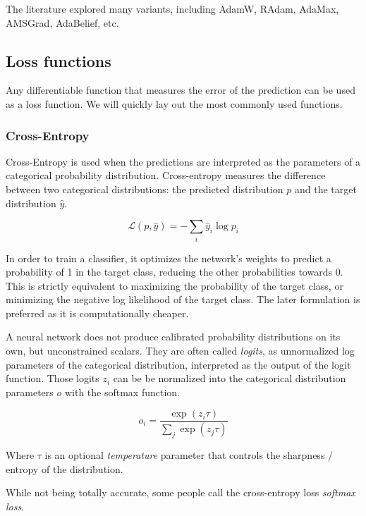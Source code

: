 The literature explored many variants, including AdamW, RAdam, AdaMax, AMSGrad, AdaBelief, etc.

\subsection{Loss functions}

Any differentiable function that measures the error of the prediction can be used as a loss function. We will quickly lay out the most commonly used functions. 

\subsubsection{Cross-Entropy}

Cross-Entropy is used when the predictions are interpreted as the parameters of a categorical probability distribution. Cross-entropy measures the difference between two categorical distributions: the predicted distribution $p$ and the target distribution $\hat{y}$.

\begin{equation}
    \mathcal{L}(p, \hat{y}) = - \sum_i \hat{y}_i \log p_i
\end{equation}

In order to train a classifier, it optimizes the network's weights to predict a probability of 1 in the target class, reducing the other probabilities towards 0. This is strictly equivalent to maximizing the probability of the target class, or minimizing the negative log likelihood of the target class. The later formulation is preferred as it is computationally cheaper.

A neural network does not produce calibrated probability distributions on its own, but unconstrained scalars. They are often called \emph{logits}, as unnormalized log parameters of the categorical distribution, interpreted as the output of the logit function. Those logits $z_i$ can be be normalized into the categorical distribution parameters $o$ with the softmax function.

\begin{equation}
    o_i = \frac{\exp (z_i \tau)}{\sum_j \exp (z_j \tau)}
\end{equation}

Where $\tau$ is an optional \emph{temperature} parameter that controls the sharpness / entropy of the distribution.

While not being totally accurate, some people call the cross-entropy loss \emph{softmax loss}.

